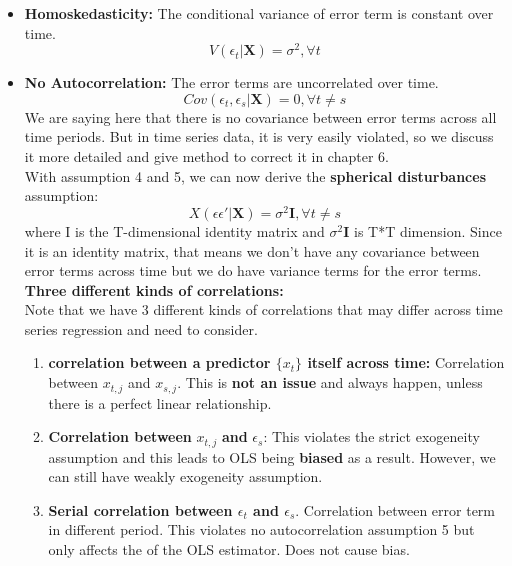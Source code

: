 \documentclass[12pt]{article}
\begin{document}
\begin{itemize}
\item \textbf{Homoskedasticity:}
The conditional variance of error term is constant over time.
\begin{equation}
V(\epsilon_t|\textbf{X}) = \sigma^2, \forall t
\end{equation}

\item \textbf{No Autocorrelation:}
The error terms are uncorrelated over time.
\begin{equation}
Cov(\epsilon_t, \epsilon_s|\textbf{X}) = 0, \forall t \ne s
\end{equation}
We are saying here that there is no covariance between error terms across all time periods. But in time series data, it is very easily violated, so we discuss it more detailed and give method to correct it in chapter 6. 
\\

With assumption 4 and 5, we can now derive the \textbf{spherical disturbances} assumption:
\begin{equation}
X(\epsilon \epsilon'|\textbf{X}) = \sigma^2 \textbf{I} , \forall t \ne s
\end{equation}
where I is the T-dimensional identity matrix and $\sigma^2 \textbf{I}$ is T*T dimension. Since it is an identity matrix, that means we don’t have any covariance between error terms across time but we do have variance terms for the error terms.
\\ 

\noindent
{\color{DarkOrchid}
\textbf{ Three different kinds of correlations: }}\\
Note that we have 3 different kinds of correlations that may differ across time series regression and need to consider.
\begin{enumerate}
\item \textbf{correlation between a predictor $\{x_t\}$ itself across time: } Correlation between $x_{t,j}$ and $x_{s,j}$. This is \textbf{not an issue} and always happen, unless there is a perfect linear relationship.

\item \textbf{Correlation between} $x_{t,j}$ \textbf {and} $\epsilon_s$:
This violates the strict exogeneity assumption and this leads to OLS being \textbf{biased} as a result. However, we can still have weakly exogeneity assumption.

\item \textbf{Serial correlation between $\epsilon_t$ and $\epsilon_s$}. Correlation between error term in different period. This violates no autocorrelation assumption 5 but only affects the  of the OLS estimator. Does not cause bias.
\end{enumerate}


\end{itemize}
\end{document}
